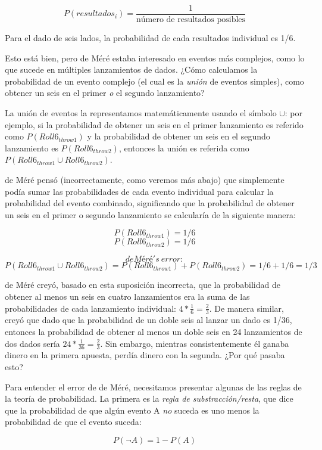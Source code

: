 \documentclass[
  12pt,
]{book}
\theoremstyle{definition}
\theoremstyle{definition}
\theoremstyle{definition}
\theoremstyle{remark}
\begin{document}
\[
P(resultados_i) = \frac{1}{\text{número de resultados posibles}}
\]

Para el dado de seis lados, la probabilidad de cada resultados individual es 1/6.

Esto está bien, pero de Méré estaba interesado en eventos más complejos, como lo que sucede en múltiples lanzamientos de dados. ¿Cómo calculamos la probabilidad de un evento complejo (el cual es la \emph{unión} de eventos simples), como obtener un seis en el primer \emph{o} el segundo lanzamiento?

La unión de eventos la representamos matemáticamente usando el símbolo \(\cup\): por ejemplo, si la probabilidad de obtener un seis en el primer lanzamiento es referido como \(P(Roll6_{throw1})\) y la probabilidad de obtener un seis en el segundo lanzamiento es \(P(Roll6_{throw2})\), entonces la unión es referida como \(P(Roll6_{throw1} \cup Roll6_{throw2})\).

de Méré pensó (incorrectamente, como veremos más abajo) que simplemente podía sumar las probabilidades de cada evento individual para calcular la probabilidad del evento combinado, significando que la probabilidad de obtener un seis en el primer o segundo lanzamiento se calcularía de la siguiente manera:

\[
P(Roll6_{throw1}) = 1/6
\]
\[
P(Roll6_{throw2}) = 1/6
\]

\[
de Méré's \ error:
\]
\[
P(Roll6_{throw1} \cup Roll6_{throw2}) = P(Roll6_{throw1}) + P(Roll6_{throw2}) = 1/6 + 1/6 = 1/3
\]

de Méré creyó, basado en esta suposición incorrecta, que la probabilidad de obtener al menos un seis en cuatro lanzamientos era la suma de las probabilidades de cada lanzamiento individual: \(4*\frac{1}{6}=\frac{2}{3}\). De manera similar, creyó que dado que la probabilidad de un doble seis al lanzar un dado es 1/36, entonces la probabilidad de obtener al menos un doble seis en 24 lanzamientos de dos dados sería \(24*\frac{1}{36}=\frac{2}{3}\). Sin embargo, mientras consistentemente él ganaba dinero en la primera apuesta, perdía dinero con la segunda. ¿Por qué pasaba esto?

Para entender el error de de Méré, necesitamos presentar algunas de las reglas de la teoría de probabilidad. La primera es la \emph{regla de substracción/resta}, que dice que la probabilidad de que algún evento A \emph{no} suceda es uno menos la probabilidad de que el evento suceda:

\[
P(\neg A) = 1 - P(A)
\]
\end{document}
